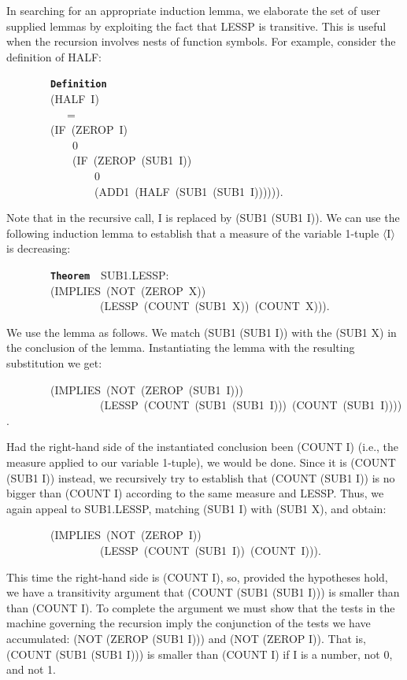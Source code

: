 \documentclass[11pt]{book}
\newenvironment{pubasis}{\begin{flushleft}\ttfamily\small}{\normalsize\rmfamily\end{flushleft}}
\newcommand{\axiomordefinition}[1]{\vspace{6pt}\texttt{\textbf{#1}}}
\begin{document}
In searching for an appropriate induction lemma, we elaborate the set of
user supplied lemmas by exploiting the fact that LESSP is transitive.
This is useful when the recursion involves nests of function symbols.
For example, consider the definition of HALF:
\begin{pubasis}
~~~~~~~~\axiomordefinition{Definition}\\
~~~~~~~~(HALF~I)\\
~~~~~~~~~~~=\\
~~~~~~~~(IF~(ZEROP~I)\\
~~~~~~~~~~~~0\\
~~~~~~~~~~~~(IF~(ZEROP~(SUB1~I))\\
~~~~~~~~~~~~~~~~0\\
~~~~~~~~~~~~~~~~(ADD1~(HALF~(SUB1~(SUB1~I)))))).\\
\end{pubasis}
Note that in the recursive call, I is replaced by (SUB1 (SUB1 I)).
We can use the following induction lemma to establish that a measure of
the variable 1-tuple $\langle$I$\rangle$ is
decreasing:
\begin{pubasis}
~~~~~~~~\axiomordefinition{Theorem}~~SUB1.LESSP:\\
~~~~~~~~(IMPLIES~(NOT~(ZEROP~X))\\
~~~~~~~~~~~~~~~~~(LESSP~(COUNT~(SUB1~X))~(COUNT~X))).\\
\end{pubasis}
We use the lemma as follows.
We match (SUB1 (SUB1 I)) with the (SUB1 X) in the conclusion of the
lemma.  Instantiating the lemma with the resulting substitution we get:
\begin{pubasis}
~~~~~~~~(IMPLIES~(NOT~(ZEROP~(SUB1~I)))\\
~~~~~~~~~~~~~~~~~(LESSP~(COUNT~(SUB1~(SUB1~I)))~(COUNT~(SUB1~I)))).\\
\end{pubasis}
Had the right-hand side of the instantiated conclusion been (COUNT I)
(i.e., the measure applied to our variable 1-tuple), we would be
done.  Since it is (COUNT (SUB1 I)) instead, we recursively try to establish
that (COUNT (SUB1 I)) is no bigger than (COUNT I) according to the same measure and
LESSP.
Thus, we again appeal to SUB1.LESSP, matching (SUB1 I) with (SUB1 X), and
obtain:
\begin{pubasis}
~~~~~~~~(IMPLIES~(NOT~(ZEROP~I))\\
~~~~~~~~~~~~~~~~~(LESSP~(COUNT~(SUB1~I))~(COUNT~I))).\\
\end{pubasis}
This time the right-hand side is (COUNT I), so, provided the hypotheses
hold, we have a transitivity argument that (COUNT (SUB1 (SUB1 I))) is smaller than
than (COUNT I).  To complete the argument we must show
that the tests in the machine governing the recursion imply
the conjunction of the tests we have accumulated:  (NOT (ZEROP (SUB1 I)))
and (NOT (ZEROP I)).  That is,  (COUNT (SUB1 (SUB1 I))) is
smaller than (COUNT I) if I
is a number, not 0, and not 1.
\end{document}
